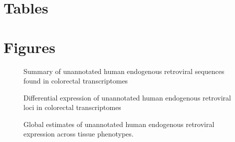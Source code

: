 \documentclass[11pt,letterpaper]{article}  %
\begin{document}
\newpage
\section*{Tables}



\FloatBarrier
\newpage
\section*{Figures}

\begin{figure}[ht]
  \caption{Summary of unannotated human endogenous retroviral sequences found in colorectal transcriptomes}
  \label{fig:pre_sum}
\end{figure}

\begin{figure}[ht]
  \caption{Differential expression of unannotated human endogenous retroviral loci in colorectal transcriptomes}
  \label{fig:dge_res}
\end{figure}

\begin{figure}[ht]
  \caption{Global estimates of unannotated human endogenous retroviral expression across tissue phenotypes.}
  \label{fig:heat}
\end{figure}
\end{document}
